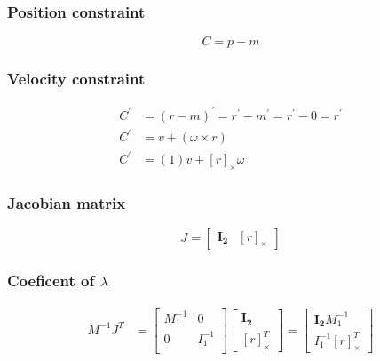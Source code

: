 \documentclass{article}
\begin{document}
	\subsubsection{Position constraint}
	$$
		C = p - m
	$$
	\subsubsection{Velocity constraint}
	\begin{align}
		C^{'} &= (r - m)^{'} = r^{'} - m^{'} = r^{'} - 0 = r^{'}\\
		C^{'} &= v + (\omega \times r)\\
		C^{'} &= \boxed{(1)} v + \boxed{[r]_{\times}} \omega
	\end{align}	
	\subsubsection{Jacobian matrix}
	$$
		J =
		\begin{bmatrix}
			\boldsymbol{I_2} & [r]_{\times}
		\end{bmatrix}
	$$
	\subsubsection{Coeficent of $\lambda$}
	\begin{align*}
		M^{-1}J^T 
		&=	
		\begin{bmatrix}
			M_1^{-1} 	& 0\\
			0 			& I_1^{-1}\\
		\end{bmatrix}
		\begin{bmatrix}
			\boldsymbol{I_2}\\
			[r]_{\times}^T
		\end{bmatrix}
		=
		\begin{bmatrix}
			\boldsymbol{I_2} M_1^{-1}\\
			I_1^{-1} [r]_{\times}^T
		\end{bmatrix}
	\end{align*}
\end{document}
